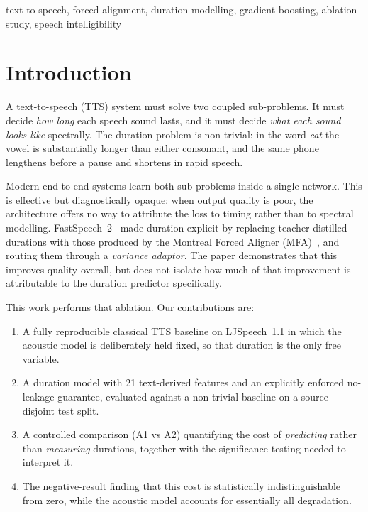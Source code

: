 \documentclass[conference]{IEEEtran}
\begin{document}
\begin{IEEEkeywords}
text-to-speech, forced alignment, duration modelling, gradient boosting, ablation study, speech
intelligibility
\end{IEEEkeywords}

\section{Introduction}

A text-to-speech (TTS) system must solve two coupled sub-problems. It must decide \emph{how long}
each speech sound lasts, and it must decide \emph{what each sound looks like} spectrally. The
duration problem is non-trivial: in the word \emph{cat} the vowel is substantially longer than
either consonant, and the same phone lengthens before a pause and shortens in rapid speech.

Modern end-to-end systems learn both sub-problems inside a single network. This is effective but
diagnostically opaque: when output quality is poor, the architecture offers no way to attribute
the loss to timing rather than to spectral modelling. FastSpeech~2~\cite{ren2021fastspeech2} made
duration explicit by replacing teacher-distilled durations with those produced by the Montreal
Forced Aligner (MFA)~\cite{mcauliffe2017mfa}, and routing them through a \emph{variance adaptor}.
The paper demonstrates that this improves quality overall, but does not isolate how much of that
improvement is attributable to the duration predictor specifically.

This work performs that ablation. Our contributions are:

\begin{enumerate}
\item A fully reproducible classical TTS baseline on LJSpeech~1.1 in which the acoustic model is
      deliberately held fixed, so that duration is the only free variable.
\item A duration model with 21 text-derived features and an explicitly enforced no-leakage
      guarantee, evaluated against a non-trivial baseline on a source-disjoint test split.
\item A controlled comparison (A1 vs A2) quantifying the cost of \emph{predicting} rather than
      \emph{measuring} durations, together with the significance testing needed to interpret it.
\item The negative-result finding that this cost is statistically indistinguishable from zero,
      while the acoustic model accounts for essentially all degradation.
\end{enumerate}
\end{document}
